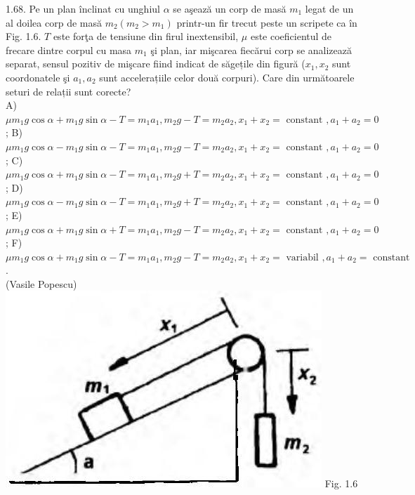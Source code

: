 1.68. Pe un plan înclinat cu unghiul $\alpha$ se aşează un corp de masă $m_{1}$ legat de un al doilea corp de masă $m_{2} \left(m_{2}>m_{1}\right)$ printr-un fir trecut peste un scripete ca în Fig. 1.6. $T$ este forţa de tensiune din firul inextensibil, $\mu$ este coeficientul de frecare dintre corpul cu masa $m_{1}$ şi plan, iar mişcarea fiecărui corp se analizează separat, sensul pozitiv de mişcare fiind indicat de săgețile din figură ($x_{1}, x_{2}$ sunt coordonatele şi $a_{1}, a_{2}$ sunt accelerațiile celor două corpuri). Care din următoarele seturi de relații sunt corecte?\\ A) $\mu m_{1} g \cos \alpha+m_{1} g \sin \alpha-T=m_{1} a_{1}, m_{2} g-T=m_{2} a_{2}, x_{1}+x_{2}=\text{ constant }, a_{1}+a_{2}=0$; B) $\mu m_{1} g \cos \alpha-m_{1} g \sin \alpha-T=m_{1} a_{1}, m_{2} g-T=m_{2} a_{2}, x_{1}+x_{2}=\text{ constant }, a_{1}+a_{2}=0$; C) $\mu m_{1} g \cos \alpha+m_{1} g \sin \alpha-T=m_{1} a_{1}, m_{2} g+T=m_{2} a_{2}, x_{1}+x_{2}=\text{ constant }, a_{1}+a_{2}=0$; D) $\mu m_{1} g \cos \alpha-m_{1} g \sin \alpha-T=m_{1} a_{1}, m_{2} g+T=m_{2} a_{2}, x_{1}+x_{2}=\text{ constant }, a_{1}+a_{2}=0$; E) $\mu m_{1} g \cos \alpha+m_{1} g \sin \alpha+T=m_{1} a_{1}, m_{2} g-T=m_{2} a_{2}, x_{1}+x_{2}=\text{ constant }, a_{1}+a_{2}=0$; F) $\mu m_{1} g \cos \alpha+m_{1} g \sin \alpha-T=m_{1} a_{1}, m_{2} g-T=m_{2} a_{2}, x_{1}+x_{2}=\text{ variabil }, a_{1}+a_{2}=\text{ constant }$.\\ (Vasile Popescu)\\ \includegraphics[width=0.4\linewidth]{images/2025_07_01_5b3ff9fa0d508c8e9f17g-017} Fig. 1.6\\

